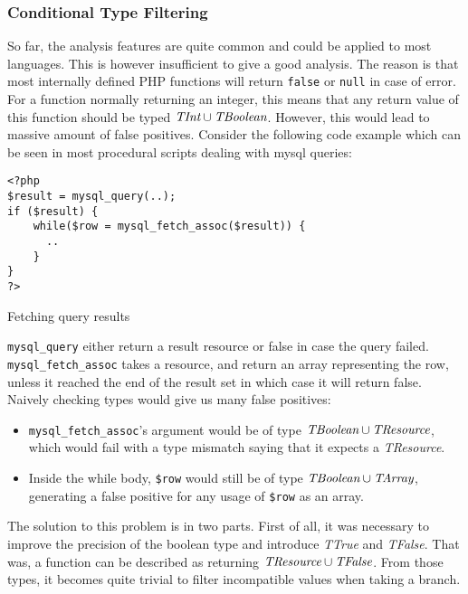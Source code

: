 \documentclass[a4paper]{article}
\begin{document}
\subsubsection{Conditional Type Filtering}
\label{cond-type-filtr}
So far, the analysis features are quite common and could be applied to most
languages. This is however insufficient to give a good analysis. The reason is
that most internally defined PHP functions will return \verb/false/ or
\verb/null/ in case of error. For a function normally returning an integer,
this means that any return value of this function should be typed
$\emph{TInt} \cup \emph{TBoolean}$. However, this would lead to massive amount of false
positives. Consider the following code example which can be seen in most
procedural scripts dealing with mysql queries:

\begin{listing}
  \begin{verbatim}
<?php
$result = mysql_query(..);
if ($result) {
    while($row = mysql_fetch_assoc($result)) {
      ..
    }
}
?>
  \end{verbatim}
  \caption{Fetching query results}
\end{listing}

\verb/mysql_query/ either return a result resource or false in case the query
failed. \verb/mysql_fetch_assoc/ takes a resource, and return an array
representing the row, unless it reached the end of the result set in which case
it will return false. Naively checking types would give us many false
positives:
\begin{itemize}
  \item \verb/mysql_fetch_assoc/'s argument would be of type
    $\emph{TBoolean} \cup \emph{TResource}$, which would fail with a type
    mismatch saying that it expects a \emph{TResource}.
  \item Inside the while body, \verb/$row/ would still be of type $\emph{TBoolean}
    \cup \emph{TArray}$, generating a false positive for any usage of
    \verb/$row/ as an array.
\end{itemize}

The solution to this problem is in two parts. First of all, it was necessary to
improve the precision of the boolean type and introduce \emph{TTrue} and
\emph{TFalse}.  That was, a function can be described as returning
$\emph{TResource} \cup \emph{TFalse}$.  From those types, it becomes quite
trivial to filter incompatible values when taking a branch.
\end{document}
